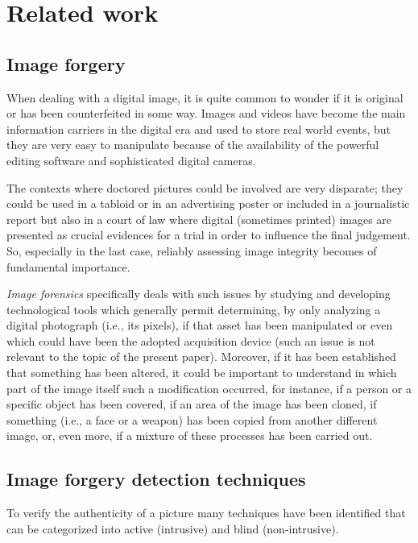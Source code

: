 \chapter{Related work}

\section{Image forgery}

When dealing with a digital image, it is quite common to wonder if it is original or has been counterfeited in some way. Images and videos have become the main information carriers in the digital era and used to store real world events, but  they are very easy to manipulate because of the availability of the powerful editing software and sophisticated digital cameras.

The contexts where doctored pictures could be involved are very disparate; they could be used in a tabloid or in an advertising poster or included in a journalistic report but also in a court of law where digital (sometimes printed) images are presented as crucial evidences for a trial in order to influence the final judgement. So, especially in the last case, reliably assessing image integrity becomes of fundamental importance. 

\emph{Image forensics} specifically deals with such issues by studying and developing technological tools which generally permit determining, by only analyzing a digital photograph (i.e., its pixels), if that asset has been manipulated or even which could have been the adopted acquisition device (such an issue is not relevant to the topic of the present paper). Moreover, if it has been established that something has been altered, it could be important to understand in which part of the image itself such a modification occurred, for instance, if a person or a specific object has been covered, if an area of the image has been cloned, if something (i.e., a face or a weapon) has been copied from another different image, or, even more, if a mixture of these processes has been carried out. 

\section{Image forgery detection techniques}

To verify the authenticity of a picture many techniques have been identified that can be categorized into active (intrusive) and blind (non-intrusive).

